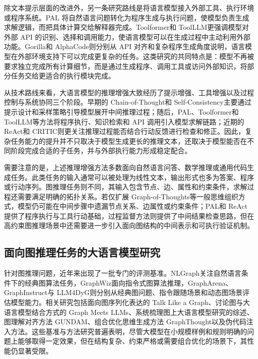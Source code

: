 除文本提示层面的改进外，另一条研究路线是将语言模型接入外部工具、执行环境或程序系统。PAL 将自然语言问题转化为程序生成与执行问题，使模型负责生成求解逻辑，而把具体计算交给解释器完成\cite{gao2023pal}。Toolformer\cite{schick2023toolformer}和 ToolLLM\cite{qin2023toolllm}更强调模型对外部 API 的识别、选择和调用能力，使语言模型可以在生成过程中主动利用外部功能。Gorilla\cite{gorilla2024}和 AlphaCode\cite{liang2022alphacode}则分别从 API 对齐和复杂程序生成角度说明，语言模型在外部环境支持下可以完成更复杂的任务。这类研究的共同特点是：模型不再被要求独立完成所有计算细节，而是通过生成程序、调用工具或访问外部知识，将部分任务交给更适合的执行模块完成。

从技术路线来看，大语言模型的推理增强大致经历了提示增强、工具增强以及过程控制与系统协同三个阶段。早期的 Chain-of-Thought\cite{wei2022chain}和 Self-Consistency\cite{wang2023selfconsistency}主要通过提示设计和采样策略引导模型展开中间推理过程；随后，PAL\cite{gao2023pal}、Toolformer\cite{schick2023toolformer}和 ToolLLM\cite{qin2023toolllm}等方法将程序执行、知识检索和 API 调用引入模型求解链路；近期的 ReAct\cite{yao2023react}和 CRITIC\cite{critic2024}则更关注推理过程能否结合行动反馈进行检查和修正。因此，复杂任务能力的提升并不只取决于模型生成更长的推理文本，还取决于模型能否在不同阶段完成合适的子任务，并与外部执行能力形成稳定配合。

需要注意的是，上述推理增强方法多数面向自然语言问答、数学推理或通用代码生成任务。此类任务的输入通常可以被处理为线性文本，输出形式也多为答案、程序或行动序列。图推理任务则不同，其输入包含节点、边、属性和约束条件，求解过程还需要满足明确的拓扑关系。若仅扩展 Graph-of-Thoughts\cite{besta2024graph}等一般思维组织方式，模型仍可能在中间步骤中遗漏节点关系、边属性或约束条件；PAL\cite{gao2023pal}和 ReAct\cite{yao2023react}提供了程序执行与工具行动基础，过程监督方法\cite{lightman2023processreward}则提供了中间结果检查思路，但在高约束图推理场景中还需要进一步引入面向图结构的中间表示和可执行验证机制。

\subsection{面向图推理任务的大语言模型研究}

针对图推理问题，近年来出现了一批专门的评测基准。NLGraph\cite{chen2024nlgraph}关注自然语言条件下的经典图算法任务，GraphWiz\cite{gong2024graphwiz}面向指令式图算法推理，GraphArena\cite{tang2025grapharena}、GraphInstruct\cite{graphinstruct2024}与 LLM4DyG\cite{llm4dyg2024}则分别从经典图问题、指令跟随场景和动态图场景评估模型能力。相关研究包括面向图序列化表达的 Talk Like a Graph\cite{fatemi2024talk}、讨论图与大语言模型结合方式的 Graph Meets LLMs\cite{zhang2023graphmeetsllms}、系统梳理图上大语言模型研究的综述\cite{jin2024llmgraphs}、图理解对齐方法 GUNDAM\cite{gundam2024}、组合优化思维生成方法 GraphThought\cite{graphthought2025}以及伪代码注入方法\cite{pseudocode2025}。这些基准与方法研究普遍表明，尽管大模型在小规模样例和规则明确的问题上能够取得一定效果，但在结构复杂、约束严格或需要组合优化的场景下，其性能仍显著受限。

